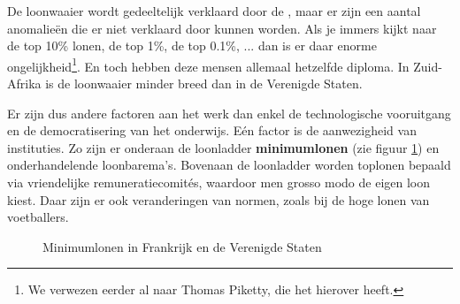\par De loonwaaier wordt gedeeltelijk verklaard door de , maar er zijn een aantal anomalie\"en die er niet verklaard door kunnen worden. Als je immers kijkt naar de top 10\% lonen, de top 1\%, de top 0.1\%, ... dan is er daar enorme ongelijkheid\footnote{We verwezen eerder al naar Thomas Piketty, die het hierover heeft.}. En toch hebben deze mensen allemaal hetzelfde diploma. In Zuid-Afrika is de loonwaaier minder breed dan in de Verenigde Staten. 
\par Er zijn dus andere factoren aan het werk dan enkel de technologische vooruitgang en de democratisering van het onderwijs. E\'en factor is de aanwezigheid van instituties. Zo zijn er onderaan de loonladder \textbf{minimumlonen} (zie figuur \ref{fig:h6minimum}) en onderhandelende loonbarema's. Bovenaan de loonladder worden toplonen bepaald via vriendelijke remuneratiecomit\'es, waardoor men grosso modo de eigen loon kiest. Daar zijn er ook veranderingen van normen, zoals bij de hoge lonen van voetballers.

\begin{figure}[H]
\small\centering\captionsetup{justification=centering,margin=2cm}
\caption{Minimumlonen in Frankrijk en de Verenigde Staten}
\label{fig:h6minimum}
\end{figure}


